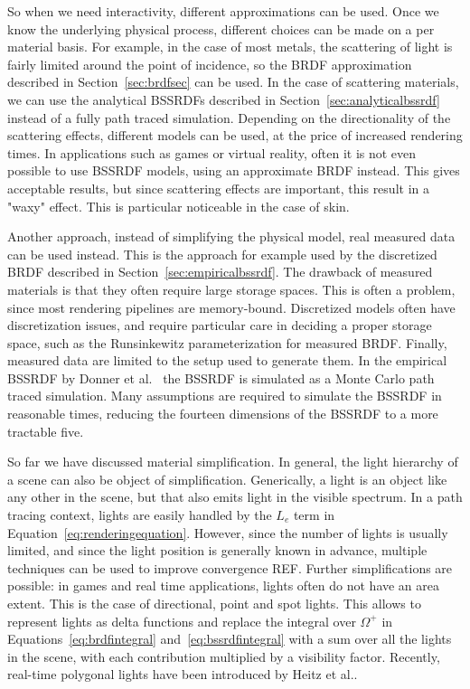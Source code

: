 So when we need interactivity, different approximations can be used. Once we know the underlying physical process, different choices can be made on a per material basis. For example, in the case of most metals, the scattering of light is fairly limited around the point of incidence, so the BRDF approximation described in Section~\ref{sec:brdfsec} can be used. In the case of scattering materials, we can use the analytical BSSRDFs described in Section~\ref{sec:analyticalbssrdf} instead of a fully path traced simulation. Depending on the directionality of the scattering effects, different models can be used, at the price of increased rendering times. In applications such as games or virtual reality, often it is not even possible to use BSSRDF models, using an approximate BRDF instead. This gives acceptable results, but since scattering effects are important, this result in a "waxy" effect. This is particular noticeable in the case of skin. 

Another approach, instead of simplifying the physical model, real measured data can be used instead. This is the approach for example used by the discretized BRDF described in Section~\ref{sec:empiricalbssrdf}. The drawback of measured materials is that they often require large storage spaces. This is often a problem, since most rendering pipelines are memory-bound. Discretized models often have discretization issues, and require particular care in deciding a proper storage space, such as the Runsinkewitz parameterization for measured BRDF. Finally, measured data are limited to the setup used to generate them. In the empirical BSSRDF by Donner et al.~\cite{Donner2009} the BSSRDF is simulated as a Monte Carlo path traced simulation. Many assumptions are required to simulate the BSSRDF in reasonable times, reducing the fourteen dimensions of the BSSRDF to a more tractable five.  

So far we have discussed material simplification. In general, the light hierarchy of a scene can also be object of simplification. Generically, a light is an object like any other in the scene, but that also emits light in the visible spectrum. In a path tracing context, lights are easily handled by the $L_e$ term in Equation~\ref{eq:renderingequation}. However, since the number of lights is usually limited, and since the light position is generally known in advance, multiple techniques can be used to improve convergence REF. Further simplifications are possible: in games and real time applications, lights often do not have an area extent. This is the case of directional, point and spot lights. This allows to represent lights as delta functions and replace the integral over $\Omega^+$ in Equations~\ref{eq:brdfintegral} and~\ref{eq:bssrdfintegral} with a sum over all the lights in the scene, with each contribution multiplied by a visibility factor. Recently, real-time polygonal lights have been introduced by Heitz et al.\cite{Heitz2016}.

